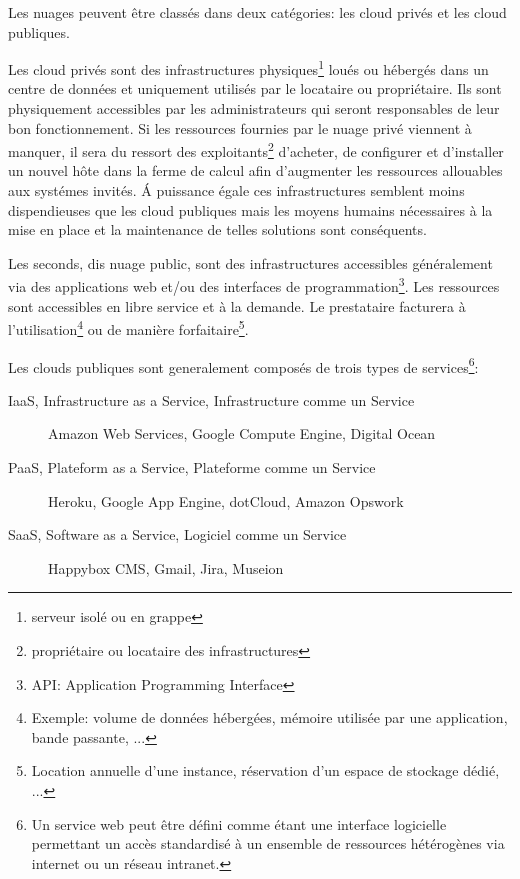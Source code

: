 \documentclass[11pt, a4paper ]{article}
\begin{document}
Les nuages peuvent être classés dans deux catégories: les cloud privés et les cloud publiques.


Les cloud privés sont des infrastructures physiques\footnote{serveur isolé ou en grappe} loués ou hébergés dans un centre de données et uniquement utilisés par le locataire ou propriétaire. Ils sont physiquement accessibles par les administrateurs qui seront responsables de leur bon fonctionnement. Si les ressources fournies par le nuage privé viennent à manquer, il sera du ressort des exploitants\footnote{propriétaire ou locataire des infrastructures} d'acheter, de configurer et d'installer un nouvel hôte dans la ferme de calcul afin d'augmenter les ressources allouables aux systémes invités. Á puissance égale ces infrastructures semblent moins dispendieuses que les cloud publiques mais les moyens humains nécessaires à la mise en place et la maintenance de telles solutions sont conséquents.

Les seconds, dis nuage public, sont des infrastructures accessibles généralement via des applications web et/ou des interfaces de programmation\footnote{API: Application Programming Interface}. Les ressources sont accessibles en libre service et à la demande. Le prestataire facturera à l'utilisation\footnote{Exemple: volume de données hébergées, mémoire utilisée par une application, bande passante, ...} ou de manière forfaitaire\footnote{Location annuelle d'une instance, réservation d'un espace de stockage dédié, ...}.

Les clouds publiques sont generalement composés de trois types de services\footnote{Un service web\cite{webServicesDef} peut être défini comme étant une interface logicielle permettant un accès standardisé à un ensemble de ressources hétérogènes via internet ou un réseau intranet.}:
\begin{description}

	\item[IaaS, Infrastructure as a Service, Infrastructure comme un Service] Amazon Web Services, Google Compute Engine, Digital Ocean

	\item[PaaS, Plateform as a Service, Plateforme comme un Service] Heroku, Google App Engine, dotCloud, Amazon Opswork

	\item[SaaS, Software as a Service, Logiciel comme un Service]
	Happybox CMS, Gmail, Jira, Museion

\end{description}
\end{document}

